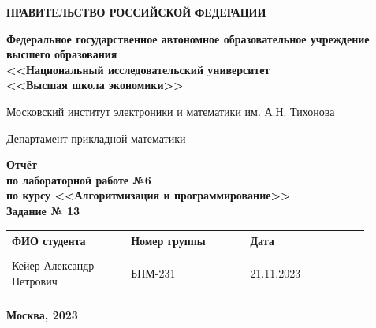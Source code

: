 \documentclass[12pt]{article}
\begin{document}
	
	\thispagestyle{empty}
	\begin{center}
		\textbf{ПРАВИТЕЛЬСТВО РОССИЙСКОЙ ФЕДЕРАЦИИ}
		
		\vspace{5ex}
		
		\textbf{Федеральное государственное автономное образовательное учреждение \\ высшего образования \\ <<Национальный исследовательский университет \\ <<Высшая школа экономики>>}
	\end{center}
	\vspace{5ex}
	
	\begin{center}
		Московский институт электроники и математики им. А.Н. Тихонова  
		
		\vspace{5ex}
		
		Департамент прикладной математики
		
		\vspace{10ex}
		\textbf{Отчёт \\ по лабораторной работе №6 \\ по курсу <<Алгоритмизация и программирование>> \\ Задание № 13}
		\vspace{7ex}
		
	\end{center}
	
	\begin{center} 
		\begin{tabular}{| p{0.3\linewidth}| p{0.3\linewidth}| p{0.3\linewidth}|}
			\hline	
			ФИО студента & Номер группы & Дата \\  \hline
			& & \\  
			Кейер Александр \newline Петрович & БПМ-231 & 21.11.2023\\  
			& & \\  \hline		
		\end{tabular}
	\end{center}
	
	\begin{center}
		\vspace{3ex}
		
		\vfill
		
		\normalsize
		
		\textbf{Москва, 2023}
	\end{center}
	
\end{document}
